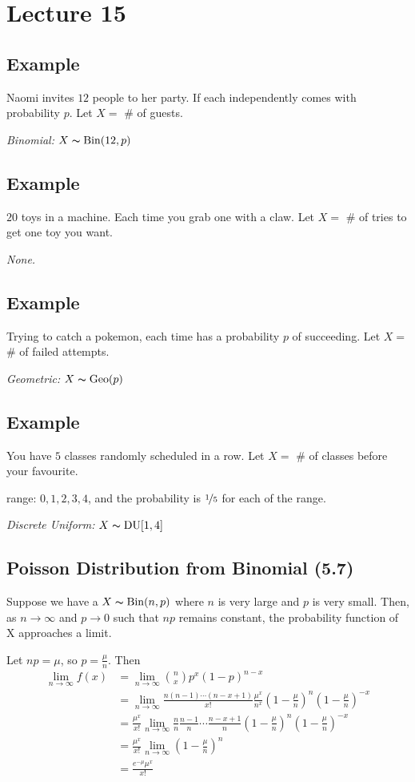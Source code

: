 \section{Lecture 15}
\subsection{Example}
Naomi invites $ 12 $ people to her party. If each independently comes with
probability $ p $.
Let $ X= $ \# of guests.

\emph{Binomial:} $ X \thicksim \operatorname{Bin}(12,p) $

\subsection{Example}
$ 20 $ toys in a machine. Each time you grab one with a claw. 
Let $ X= $ \# of tries to get one toy you want.

\emph{None.}

\subsection{Example}
Trying to catch a pokemon, each time has a probability $ p $ of succeeding.
Let $ X= $ \# of failed attempts.

\emph{Geometric:} $ X \thicksim \operatorname{Geo}(p) $

\subsection{Example}
You have $ 5 $ classes randomly scheduled in a row.
Let $ X= $ \# of classes before your favourite.

range: $ 0,1,2,3,4 $, and the probability is $ \nicefrac{1}{5} $ for each
of the range.

\emph{Discrete Uniform:} $ X \thicksim \operatorname{DU}[1,4] $

\subsection{Poisson Distribution from Binomial (5.7)}
Suppose we have a $ X \thicksim \operatorname{Bin}(n,p) $ where $ n $ is very large
and $ p $ is very small. Then, as $ n\rightarrow \infty $ and $ p\rightarrow 0 $
such that $ np $ remains constant, the probability function of X
approaches a limit.

Let $ np=\mu $, so $ p=\frac{\mu}{n} $. Then
\begin{align*}
    \lim\limits_{{n} \to {\infty}} f(x)
    &=\lim\limits_{{n} \to {\infty}} \binom{n}{x}p^x(1-p)^{n-x}\\
    &=\lim\limits_{{n} \to {\infty}} \frac{n(n-1)\cdots(n-x+1)}{x!}
    \frac{\mu^x}{n^x} (1-\frac{\mu}{n})^n(1-\frac{\mu}{n})^{-x}\\
    &=\frac{\mu^x}{x!} \lim\limits_{{n} \to {\infty}} \frac{n}{n}
    \frac{n-1}{n} \cdots \frac{n-x+1}{n}(1-\frac{\mu}{n})^n(1-\frac{\mu}{n})^{-x}\\
    &=\frac{\mu^x}{x!} \lim\limits_{{n} \to {\infty}} (1-\frac{\mu}{n})^n\\
    &=\frac{e^{-\mu}\mu^x}{x!}\\
\end{align*}

